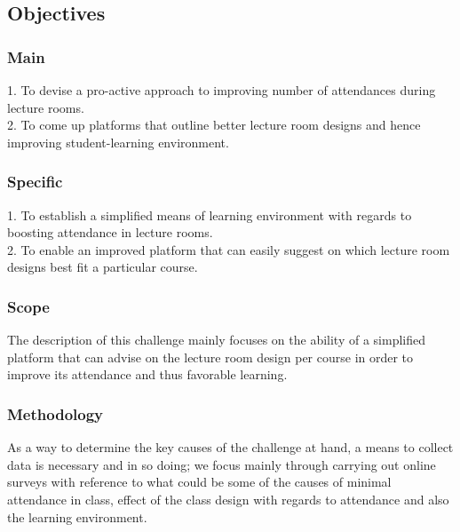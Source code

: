 \documentclass[10pt,a4paper]{report}
\begin{document}
\begin{flushleft}
\subsection*{Objectives}

\subsubsection*{Main}1. To devise a pro-active approach to improving number of attendances during lecture rooms.\\

2. To come up platforms that outline better lecture room designs and hence improving student-learning environment.

\subsubsection*{Specific}1. To establish a simplified means of learning environment with regards to boosting attendance in lecture rooms.\\

2. To enable an improved platform that can easily suggest on which lecture room designs best fit a particular course.

\subsubsection*{Scope}The description of this challenge mainly focuses on the ability of a simplified platform that can advise on the lecture room design per course in order to improve its attendance and thus favorable learning.

	
\subsubsection*{Methodology}As a way to determine the key causes of the challenge at hand, a means to collect data is necessary and in so doing; we focus mainly through carrying out online surveys with reference to what could be some of the causes of minimal attendance in class, effect of the class design with regards to attendance and also the learning environment.\\


\end{flushleft}
\end{document}
